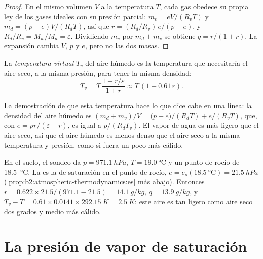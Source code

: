\begin{proof}
En el mismo volumen $V$ a la temperatura $T$, cada gas obedece su propia ley de los gases ideales con su
presión parcial: $m_v = eV/(R_vT)$ y $m_d = (p - e)V/(R_dT)$, así que $r = (R_d/R_v)\,e/(p - e)$,
y $R_d/R_v = M_w/M_d = \varepsilon$. Dividiendo $m_v$ por $m_d + m_v$ se obtiene $q = r/(1 + r)$.
La expansión cambia $V$, $p$ y $e$, pero no las dos masas.
\end{proof}

\begin{definition}\label{def:b2:atmospheric-thermodynamics:virtual}
La \emph{temperatura virtual} $T_v$ del aire húmedo es la temperatura
que necesitaría el aire seco, a la misma presión, para tener la misma densidad:
\[
  T_v = T\,\frac{1 + r/\varepsilon}{1 + r} \approx T\,(1 + 0.61\,r) .
\]
\end{definition}

La demostración de que esta temperatura hace lo que dice cabe en una línea: la densidad del aire húmedo es
$(m_d + m_v)/V = \bigl(p - e\bigr)/(R_dT) + e/(R_vT)$, que, con $e = pr/(\varepsilon + r)$,
es igual a $p/(R_dT_v)$. El vapor de agua es más ligero que el aire seco, así que el aire húmedo es menos denso que el aire
seco a la misma temperatura y presión, como si fuera un poco más cálido.

\begin{example}\label{ex:b2:atmospheric-thermodynamics:norman}
En el suelo, el sondeo da $p = \qty{971.1}{hPa}$, $T = \qty{19.0}{\celsius}$ y un punto de
rocío de \qty{18.5}{\celsius}. La  es la  de saturación en el punto
de rocío, $e = e_s(\qty{18.5}{\celsius}) = \qty{21.5}{hPa}$ (\cref{prop:b2:atmospheric-thermodynamics:es}
más abajo). Entonces $r = 0.622 \times 21.5/(971.1 - 21.5) = \qty{14.1}{g/kg}$, $q = \qty{13.9}{g/kg}$,
y $T_v - T = 0.61 \times 0.0141 \times \qty{292.15}{K} = \qty{2.5}{K}$: este aire es tan ligero como
aire seco dos grados y medio más cálido.
\end{example}

\section{La presión de vapor de saturación}\label{sec:b2:atmospheric-thermodynamics:saturation}

